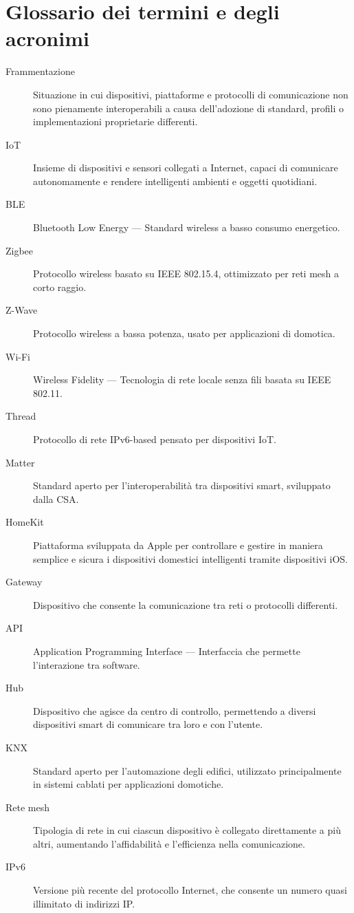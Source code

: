 \chapter{Glossario dei termini e degli acronimi}
\begin{description}
    \item[Frammentazione] Situazione in cui dispositivi, piattaforme e protocolli di comunicazione non sono pienamente interoperabili a causa dell’adozione di standard, profili o implementazioni proprietarie differenti.
    \item[IoT] Insieme di dispositivi e sensori collegati a Internet, capaci di comunicare autonomamente e rendere intelligenti ambienti e oggetti quotidiani.
    \item[BLE] Bluetooth Low Energy --- Standard wireless a basso consumo energetico.
    \item[Zigbee] Protocollo wireless basato su IEEE 802.15.4, ottimizzato per reti mesh a corto raggio.
    \item[Z-Wave] Protocollo wireless a bassa potenza, usato per applicazioni di domotica.
    \item[Wi-Fi] Wireless Fidelity --- Tecnologia di rete locale senza fili basata su IEEE 802.11.
    \item[Thread] Protocollo di rete IPv6-based pensato per dispositivi IoT.
    \item[Matter] Standard aperto per l'interoperabilità tra dispositivi smart, sviluppato dalla CSA.
    \item[HomeKit] Piattaforma sviluppata da Apple per controllare e gestire in maniera semplice e sicura i dispositivi domestici intelligenti tramite dispositivi iOS.
    \item[Gateway] Dispositivo che consente la comunicazione tra reti o protocolli differenti.
    \item[API] Application Programming Interface --- Interfaccia che permette l'interazione tra software.
    \item[Hub] Dispositivo che agisce da centro di controllo, permettendo a diversi dispositivi smart di comunicare tra loro e con l'utente.
    \item[KNX] Standard aperto per l'automazione degli edifici, utilizzato principalmente in sistemi cablati per applicazioni domotiche.
    \item[Rete mesh] Tipologia di rete in cui ciascun dispositivo è collegato direttamente a più altri, aumentando l'affidabilità e l'efficienza nella comunicazione.
    \item[IPv6] Versione più recente del protocollo Internet, che consente un numero quasi illimitato di indirizzi IP.

\end{description}
